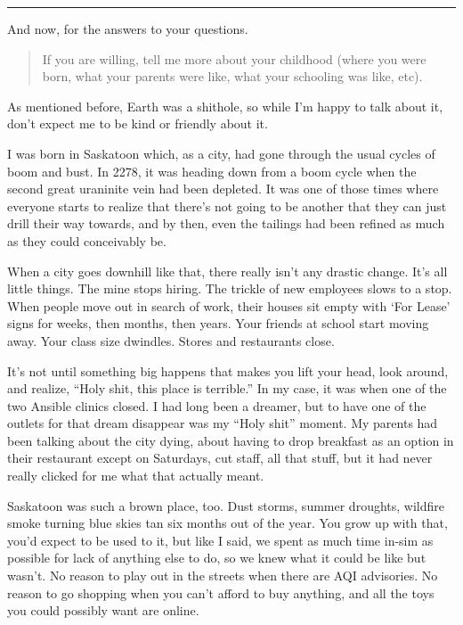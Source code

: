 \begin{center}\rule{0.5\linewidth}{0.5pt}\end{center}

\noindent And now, for the answers to your questions.

\begin{quote}
If you are willing, tell me more about your childhood (where you were born, what your parents were like, what your schooling was like, etc).
\end{quote}

\noindent As mentioned before, Earth was a shithole, so while I'm happy to talk about it, don't expect me to be kind or friendly about it.

I was born in Saskatoon which, as a city, had gone through the usual cycles of boom and bust. In 2278, it was heading down from a boom cycle when the second great uraninite vein had been depleted. It was one of those times where everyone starts to realize that there's not going to be another that they can just drill their way towards, and by then, even the tailings had been refined as much as they could conceivably be.

When a city goes downhill like that, there really isn't any drastic change. It's all little things. The mine stops hiring. The trickle of new employees slows to a stop. When people move out in search of work, their houses sit empty with `For Lease' signs for weeks, then months, then years. Your friends at school start moving away. Your class size dwindles. Stores and restaurants close.

It's not until something big happens that makes you lift your head, look around, and realize, ``Holy shit, this place is terrible.'' In my case, it was when one of the two Ansible clinics closed. I had long been a dreamer, but to have one of the outlets for that dream disappear was my ``Holy shit'' moment. My parents had been talking about the city dying, about having to drop breakfast as an option in their restaurant except on Saturdays, cut staff, all that stuff, but it had never really clicked for me what that actually meant.

Saskatoon was such a brown place, too. Dust storms, summer droughts, wildfire smoke turning blue skies tan six months out of the year. You grow up with that, you'd expect to be used to it, but like I said, we spent as much time in-sim as possible for lack of anything else to do, so we knew what it could be like but wasn't. No reason to play out in the streets when there are AQI advisories. No reason to go shopping when you can't afford to buy anything, and all the toys you could possibly want are online.

